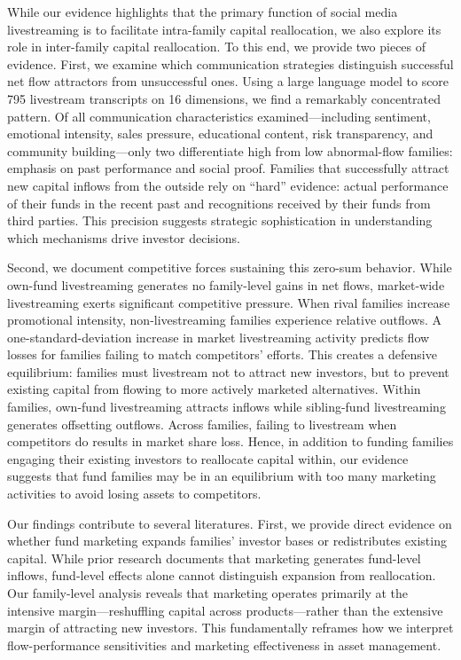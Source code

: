 \documentclass[12pt]{article}
\begin{document}
While our evidence highlights that the primary function of social media livestreaming is to facilitate intra-family capital reallocation, we also explore its role in inter-family capital reallocation. To this end, we provide two pieces of evidence. First, we examine which communication strategies distinguish successful net flow attractors from unsuccessful ones. Using a large language model to score 795 livestream transcripts on 16 dimensions, we find a remarkably concentrated pattern. Of all communication characteristics examined—including sentiment, emotional intensity, sales pressure, educational content, risk transparency, and community building—only two differentiate high from low abnormal-flow families: emphasis on past performance and social proof. Families that successfully attract new capital inflows from the outside rely on ``hard'' evidence: actual performance of their funds in the recent past and recognitions received by their funds from third parties. This precision suggests strategic sophistication in understanding which mechanisms drive investor decisions.

Second, we document competitive forces sustaining this zero-sum behavior. While own-fund livestreaming generates no family-level gains in net flows, market-wide livestreaming exerts significant competitive pressure. When rival families increase promotional intensity, non-livestreaming families experience relative outflows. A one-standard-deviation increase in market livestreaming activity predicts flow losses for families failing to match competitors' efforts. This creates a defensive equilibrium: families must livestream not to attract new investors, but to prevent existing capital from flowing to more actively marketed alternatives. Within families, own-fund livestreaming attracts inflows while sibling-fund livestreaming generates offsetting outflows. Across families, failing to livestream when competitors do results in market share loss. Hence, in addition to funding families engaging their existing investors to reallocate capital within, our evidence suggests that fund families may be in an equilibrium with too many marketing activities \citep{roussanov2021marketing} to avoid losing assets to competitors.

Our findings contribute to several literatures. First, we provide direct evidence on whether fund marketing expands families' investor bases or redistributes existing capital. While prior research documents that marketing generates fund-level inflows, fund-level effects alone cannot distinguish expansion from reallocation. Our family-level analysis reveals that marketing operates primarily at the intensive margin—reshuffling capital across products—rather than the extensive margin of attracting new investors. This fundamentally reframes how we interpret flow-performance sensitivities and marketing effectiveness in asset management.
\end{document}
